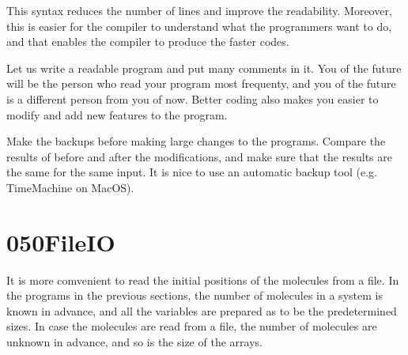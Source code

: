 \documentclass[a4,10pt]{article}
\begin{document}
This syntax reduces the number of lines and improve the readability.  Moreover, this is easier for the compiler to understand what the programmers want to do, and that enables the compiler to produce the faster codes.

\begin{shadebox}
Let us write a readable program and put many comments in it.  You of the future will be the person who read your program most frequenty, and you of the future is a different person from you of now.  Better coding also makes you easier to modify and add new features to the program.  %
\end{shadebox} 

\begin{shadebox}
Make the backups before making large changes to the programs.  Compare the results of before and after the modifications, and make sure that the results are the same for the same input.  It is nice to use an automatic backup tool (e.g. TimeMachine on MacOS).
\end{shadebox}



\section{050FileIO}

It is more comvenient to read the initial positions of the molecules from a file. %
In the programs in the previous sections, the number of molecules in a system is known in advance, and all the variables are prepared as to be the predetermined sizes.  In case the molecules are read from a file, the number of molecules are unknown in advance, and so is the size of the arrays.
\end{document}
